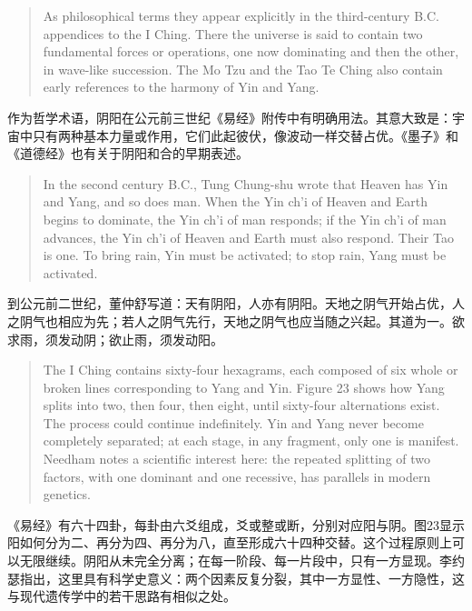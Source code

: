 \documentclass[UTF8,zihao=-4]{ctexart}
\newenvironment{enblock}
  {\par\smallskip\noindent{\scriptsize\bfseries English}\par\begin{quote}\small}
  {\end{quote}}
\newenvironment{zhblock}
  {\par\noindent{\scriptsize\bfseries 中文}\par}
  {\par\medskip}
\begin{document}
\begin{enblock}
As philosophical terms they appear explicitly in the third-century B.C. appendices to the I Ching. There the universe is said to contain two fundamental forces or operations, one now dominating and then the other, in wave-like succession. The Mo Tzu and the Tao Te Ching also contain early references to the harmony of Yin and Yang.
\end{enblock}
\begin{zhblock}
作为哲学术语，阴阳在公元前三世纪《易经》附传中有明确用法。其意大致是：宇宙中只有两种基本力量或作用，它们此起彼伏，像波动一样交替占优。《墨子》和《道德经》也有关于阴阳和合的早期表述。
\end{zhblock}

\begin{enblock}
In the second century B.C., Tung Chung-shu wrote that Heaven has Yin and Yang, and so does man. When the Yin ch'i of Heaven and Earth begins to dominate, the Yin ch'i of man responds; if the Yin ch'i of man advances, the Yin ch'i of Heaven and Earth must also respond. Their Tao is one. To bring rain, Yin must be activated; to stop rain, Yang must be activated.
\end{enblock}
\begin{zhblock}
到公元前二世纪，董仲舒写道：天有阴阳，人亦有阴阳。天地之阴气开始占优，人之阴气也相应为先；若人之阴气先行，天地之阴气也应当随之兴起。其道为一。欲求雨，须发动阴；欲止雨，须发动阳。
\end{zhblock}

\begin{enblock}
The I Ching contains sixty-four hexagrams, each composed of six whole or broken lines corresponding to Yang and Yin. Figure 23 shows how Yang splits into two, then four, then eight, until sixty-four alternations exist. The process could continue indefinitely. Yin and Yang never become completely separated; at each stage, in any fragment, only one is manifest. Needham notes a scientific interest here: the repeated splitting of two factors, with one dominant and one recessive, has parallels in modern genetics.
\end{enblock}
\begin{zhblock}
《易经》有六十四卦，每卦由六爻组成，爻或整或断，分别对应阳与阴。图23显示阳如何分为二、再分为四、再分为八，直至形成六十四种交替。这个过程原则上可以无限继续。阴阳从未完全分离；在每一阶段、每一片段中，只有一方显现。李约瑟指出，这里具有科学史意义：两个因素反复分裂，其中一方显性、一方隐性，这与现代遗传学中的若干思路有相似之处。
\end{zhblock}
\end{document}
